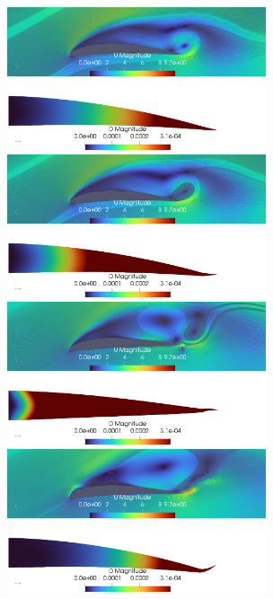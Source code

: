 \begin{figure}[hbt!]
  \centering
    \includegraphics[width=3in]{Figures/streamLines0906Coupling.png}
    \includegraphics[width=3in]{Figures/DMAgnitude0906Coupling.png}
    \includegraphics[width=3in]{Figures/streamLines0918Coupling.png}
    \includegraphics[width=3in]{Figures/DMAgnitude0918Coupling.png}
    \includegraphics[width=3in]{Figures/streamLines0958Coupling.png}
    \includegraphics[width=3in]{Figures/DMAgnitude0958Coupling.png}
    \includegraphics[width=3in]{Figures/streamLines0986Coupling.png}
    \includegraphics[width=3in]{Figures/DMAgnitude0986Coupling.png}

\end{figure}
